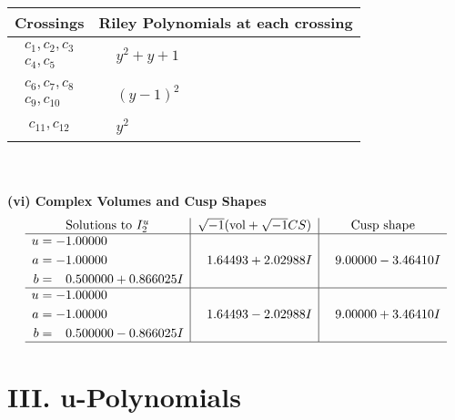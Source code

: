 \documentclass[1p]{elsarticle_modified}
\theoremstyle{definition}
\newcommand{\I}{\sqrt{-1}}
\begin{document}
\begin{tabular}{m{50pt}|m{274pt}}
Crossings & \hspace{64pt}Riley Polynomials at each crossing \\
\hline $$\begin{aligned}c_{1},c_{2},c_{3}\\c_{4},c_{5}\end{aligned}$$&$\begin{aligned}
&y^2+y+1
\end{aligned}$\\
\hline $$\begin{aligned}c_{6},c_{7},c_{8}\\c_{9},c_{10}\end{aligned}$$&$\begin{aligned}
&(y-1)^2
\end{aligned}$\\
\hline $$\begin{aligned}c_{11},c_{12}\end{aligned}$$&$\begin{aligned}
&y^2
\end{aligned}$\\
\hline
\end{tabular}\\~\\
\newpage\flushleft \textbf{(vi) Complex Volumes and Cusp Shapes}
$$\begin{array}{c|c|c}  
\text{Solutions to }I^u_{2}& \I (\text{vol} + \sqrt{-1}CS) & \text{Cusp shape}\\
 \hline 
\begin{aligned}
u &= -1.00000\phantom{ +0.000000I} \\
a &= -1.00000\phantom{ +0.000000I} \\
b &= \phantom{-}0.500000 + 0.866025 I\end{aligned}
 & \phantom{-}1.64493 + 2.02988 I & \phantom{-}9.00000 - 3.46410 I \\ \hline\begin{aligned}
u &= -1.00000\phantom{ +0.000000I} \\
a &= -1.00000\phantom{ +0.000000I} \\
b &= \phantom{-}0.500000 - 0.866025 I\end{aligned}
 & \phantom{-}1.64493 - 2.02988 I & \phantom{-}9.00000 + 3.46410 I\\
 \hline 
 \end{array}$$\newpage
\newpage\renewcommand{\arraystretch}{1}
\centering \section*{ III. u-Polynomials}
\end{document}
